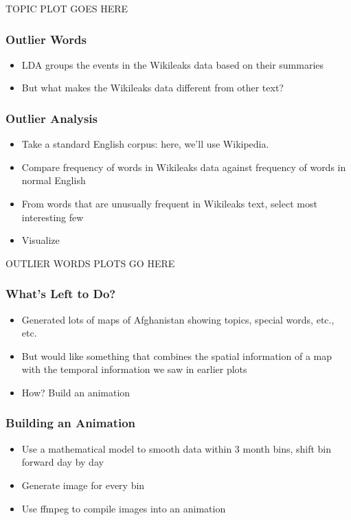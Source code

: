 \documentclass[xcolor=dvipsnames, 9pt]{beamer}
\begin{document}
\begin{frame}[fragile]
  TOPIC PLOT GOES HERE
\end{frame}

\begin{frame}
  \frametitle{Outlier Words}
  
  \begin{itemize}
    \item{LDA groups the events in the Wikileaks data based on their summaries}
    \item{But what makes the Wikileaks data different from other text?}
  \end{itemize}
\end{frame}

\begin{frame}[fragile]
  \frametitle{Outlier Analysis}
  
  \begin{itemize}
    \item{Take a standard English corpus: here, we'll use Wikipedia.}
    \item{Compare frequency of words in Wikileaks data against frequency of words in normal English}
    \item{From words that are unusually frequent in Wikileaks text, select most interesting few}
    \item{Visualize}
  \end{itemize}
\end{frame}

\begin{frame}
  OUTLIER WORDS PLOTS GO HERE
\end{frame}

\begin{frame}[fragile]
  \frametitle{What's Left to Do?}
  
  \begin{itemize}
    \item{Generated lots of maps of Afghanistan showing topics, special words, etc., etc.}
    \item{But would like something that combines the spatial information of a map with the temporal information we saw in earlier plots}
    \item{How? Build an animation}
  \end{itemize}
\end{frame}

\begin{frame}[fragile]
  \frametitle{Building an Animation}
  
  \begin{itemize}
    \item{Use a mathematical model to smooth data within 3 month bins, shift bin forward day by day}
    \item{Generate image for every bin}
    \item{Use ffmpeg to compile images into an animation}
  \end{itemize}
\end{frame}


\end{document}
